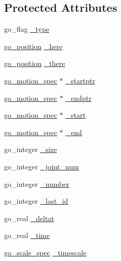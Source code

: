 \subsection*{Protected Attributes}
\begin{DoxyCompactItemize}
\item 
go\-\_\-flag \hyperlink{structgomotion_1_1go__motion__queue_a0c5400b47c8a5e5966da98832ddad2dd}{\-\_\-type}
\item 
\hyperlink{structgomotion_1_1go__position}{go\-\_\-position} \hyperlink{structgomotion_1_1go__motion__queue_a9df9c96ad6bbcbb60c0c58754790d83b}{\-\_\-here}
\item 
\hyperlink{structgomotion_1_1go__position}{go\-\_\-position} \hyperlink{structgomotion_1_1go__motion__queue_a96ac4977f0e8c0a01930f945262015fa}{\-\_\-there}
\item 
\hyperlink{structgomotion_1_1go__motion__spec}{go\-\_\-motion\-\_\-spec} $\ast$ \hyperlink{structgomotion_1_1go__motion__queue_a0115449f0ee391d3e1d473e5861d594e}{\-\_\-startptr}
\item 
\hyperlink{structgomotion_1_1go__motion__spec}{go\-\_\-motion\-\_\-spec} $\ast$ \hyperlink{structgomotion_1_1go__motion__queue_a56b0eb35d9ff084d1a1f555dae780ad9}{\-\_\-endptr}
\item 
\hyperlink{structgomotion_1_1go__motion__spec}{go\-\_\-motion\-\_\-spec} $\ast$ \hyperlink{structgomotion_1_1go__motion__queue_aa48dfdfd799a6cf63856b760d264c23b}{\-\_\-start}
\item 
\hyperlink{structgomotion_1_1go__motion__spec}{go\-\_\-motion\-\_\-spec} $\ast$ \hyperlink{structgomotion_1_1go__motion__queue_a843d9fbbb3d45019e412efe56e3356a9}{\-\_\-end}
\item 
go\-\_\-integer \hyperlink{structgomotion_1_1go__motion__queue_adc9cde829948ecc241cdcaa5b839c888}{\-\_\-size}
\item 
go\-\_\-integer \hyperlink{structgomotion_1_1go__motion__queue_ab1ba219a6f370e7df6495ca0fd958108}{\-\_\-joint\-\_\-num}
\item 
go\-\_\-integer \hyperlink{structgomotion_1_1go__motion__queue_a1c1fe7f38ef5ba8523d251d2199a19e3}{\-\_\-number}
\item 
go\-\_\-integer \hyperlink{structgomotion_1_1go__motion__queue_aeba2a7bb2b6dd7076aed9cc51904f312}{\-\_\-last\-\_\-id}
\item 
go\-\_\-real \hyperlink{structgomotion_1_1go__motion__queue_a21be21caeb469dc31cae7e4d193f6f63}{\-\_\-deltat}
\item 
go\-\_\-real \hyperlink{structgomotion_1_1go__motion__queue_a9f72301ca7a9a96fde11f519c097cdaf}{\-\_\-time}
\item 
\hyperlink{structgomotion_1_1go__scale__spec}{go\-\_\-scale\-\_\-spec} \hyperlink{structgomotion_1_1go__motion__queue_a78ce1642f13b46e810ae781a827408e6}{\-\_\-timescale}
\end{DoxyCompactItemize}


